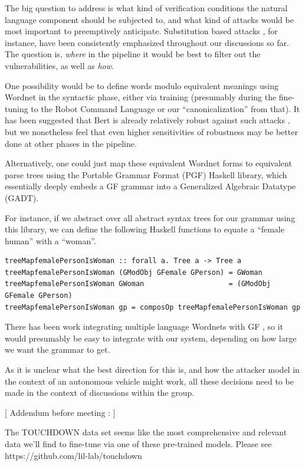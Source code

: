 \documentclass[a4paper, 11pt]{article}
\begin{document}
The big question to address is what kind of verification conditions the natural
language component should be subjected to, and what kind of attacks would be
most important to preemptively anticipate. Substitution based attacks
\cite{substAttacks}, for instance, have been consistently emphasized throughout
our discussions so far. The question is, \emph{where} in the pipeline it would
be best to filter out the vulnerabilities, as well as \emph{how}.

One possibility would be to define words modulo equivalent meanings using
Wordnet \cite{wordnet} in the syntactic phase, either via training
\cite{ren-etal-2019-generating} (presumably during the fine-tuning to the Robot
Command Language or our ``canonicalization'' from that). It has been suggested
that Bert is already relatively robust against such attacks
\cite{hauser2021bert}, but we nonetheless feel that even higher sensitivities of
robustness may be better done at other phases in the pipeline.

Alternatively, one could just map these equivalent Wordnet forms to equivalent
parse trees using the Portable Grammar Format (PGF) Haskell library, which
essentially deeply embeds a GF grammar into a Generalized Algebraic Datatype
(GADT).

For instance, if we abstract over all abstract syntax trees for our grammar
using this library, we can define the following Haskell functions to equate a
``female human'' with a ``woman''. 

\begin{verbatim}
treeMapfemalePersonIsWoman :: forall a. Tree a -> Tree a
treeMapfemalePersonIsWoman (GModObj GFemale GPerson) = GWoman
treeMapfemalePersonIsWoman GWoman                    = (GModObj GFemale GPerson)
treeMapfemalePersonIsWoman gp = composOp treeMapfemalePersonIsWoman gp
\end{verbatim}

There has been work integrating multiple language Wordnets with GF
\cite{virk2014developing}, so it would presumably be easy to integrate with our
system, depending on how large we want the grammar to get.


As it is unclear what the best direction for this is, and how the attacker model
in the context of an autonomous vehicle might work, all these decisions need to
be made in the context of discussions within the group.

[ Addendum before meeting : ]

The TOUCHDOWN data set \cite{chen2019touchdown} seems like the most
comprehensive and relevant data we'll find to fine-tune via one of these
pre-trained models. Please see https://github.com/lil-lab/touchdown
\end{document}
